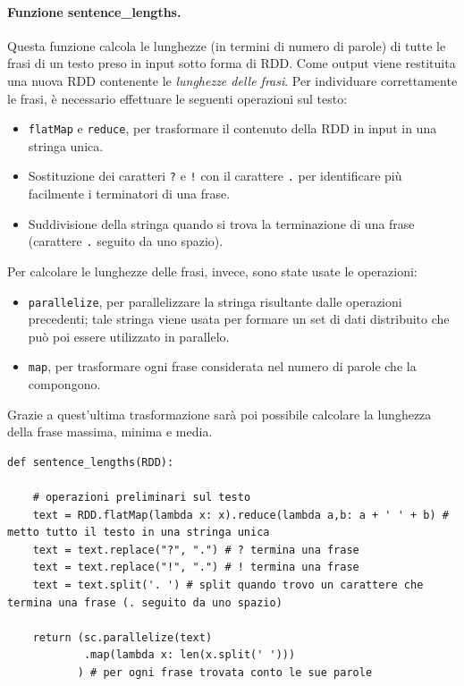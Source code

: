 \documentclass[titlepage]{article}
\begin{document}
\paragraph{Funzione sentence\_lengths.}
Questa funzione calcola le lunghezze (in termini di numero di parole) di tutte le frasi di un testo preso in input sotto forma di RDD. Come output viene restituita una nuova RDD contenente le \textit{lunghezze delle frasi}. Per individuare correttamente le frasi, è necessario effettuare le seguenti operazioni sul testo:
\begin{itemize}
    \item \texttt{flatMap} e \texttt{reduce}, per trasformare il contenuto della RDD in input in una stringa unica.
    \item Sostituzione dei caratteri \texttt{?} e \texttt{!} con il carattere \texttt{.} per identificare più facilmente i terminatori di una frase.
    \item Suddivisione della stringa quando si trova la terminazione di una frase (carattere \texttt{.} seguito da uno spazio).
\end{itemize}
Per calcolare le lunghezze delle frasi, invece, sono state usate le operazioni:
\begin{itemize}
    \item \texttt{parallelize}, per parallelizzare la stringa risultante dalle operazioni precedenti; tale stringa viene usata per formare un set di dati distribuito che può poi essere utilizzato in parallelo.
    \item \texttt{map}, per trasformare ogni frase considerata nel numero di parole che la compongono.
\end{itemize}
Grazie a quest'ultima trasformazione sarà poi possibile calcolare la lunghezza della frase massima, minima e media.
\begin{verbatim}
def sentence_lengths(RDD):

    # operazioni preliminari sul testo
    text = RDD.flatMap(lambda x: x).reduce(lambda a,b: a + ' ' + b) # metto tutto il testo in una stringa unica
    text = text.replace("?", ".") # ? termina una frase
    text = text.replace("!", ".") # ! termina una frase
    text = text.split('. ') # split quando trovo un carattere che termina una frase (. seguito da uno spazio)
    
    return (sc.parallelize(text)
            .map(lambda x: len(x.split(' ')))
           ) # per ogni frase trovata conto le sue parole
\end{verbatim}
\end{document}
